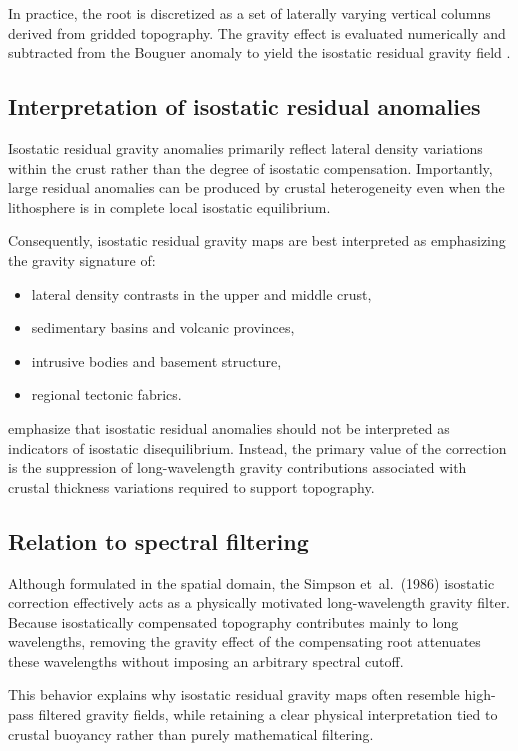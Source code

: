 In practice, the root is discretized as a set of laterally varying vertical columns derived from gridded topography. The gravity effect is evaluated numerically and subtracted from the Bouguer anomaly to yield the isostatic residual gravity field \citep{Simpson_etal1986}.

\subsection{Interpretation of isostatic residual anomalies}

Isostatic residual gravity anomalies primarily reflect lateral density variations within the crust rather than the degree of isostatic compensation. Importantly, large residual anomalies can be produced by crustal heterogeneity even when the lithosphere is in complete local isostatic equilibrium.

Consequently, isostatic residual gravity maps are best interpreted as emphasizing the gravity signature of:
\begin{itemize}
    \item lateral density contrasts in the upper and middle crust,
    \item sedimentary basins and volcanic provinces,
    \item intrusive bodies and basement structure,
    \item regional tectonic fabrics.
\end{itemize}

\citet{Simpson_etal1986} emphasize that isostatic residual anomalies should not be interpreted as indicators of isostatic disequilibrium. Instead, the primary value of the correction is the suppression of long-wavelength gravity contributions associated with crustal thickness variations required to support topography.

\subsection{Relation to spectral filtering}

Although formulated in the spatial domain, the Simpson et~al.~(1986) isostatic correction effectively acts as a physically motivated long-wavelength gravity filter. Because isostatically compensated topography contributes mainly to long wavelengths, removing the gravity effect of the compensating root attenuates these wavelengths without imposing an arbitrary spectral cutoff.

This behavior explains why isostatic residual gravity maps often resemble high-pass filtered gravity fields, while retaining a clear physical interpretation tied to crustal buoyancy rather than purely mathematical filtering.

